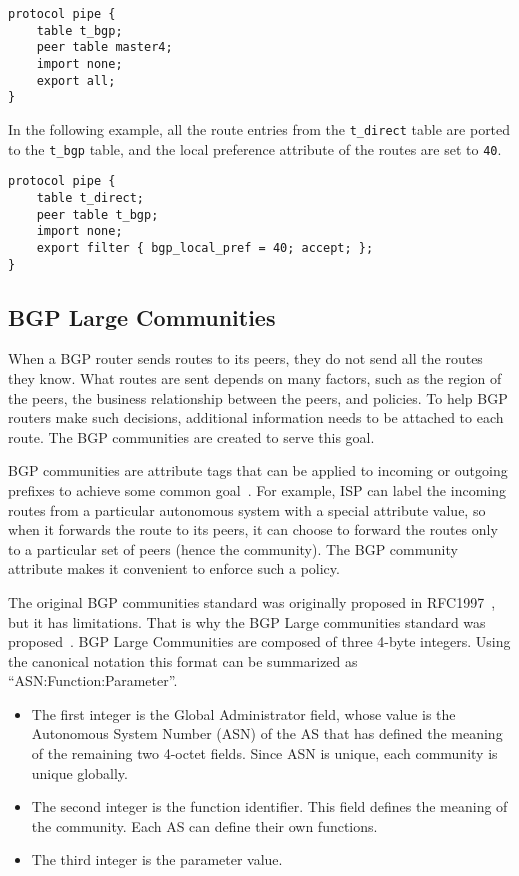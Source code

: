 \begin{lstlisting}
protocol pipe {
    table t_bgp;
    peer table master4;
    import none;
    export all;
}
\end{lstlisting}

In the following example, all the route entries from the \texttt{t\_direct}
table are ported to the \texttt{t\_bgp} table, and the local preference
attribute of the routes are set to \texttt{40}.

\begin{lstlisting}
protocol pipe {
    table t_direct;
    peer table t_bgp;
    import none;
    export filter { bgp_local_pref = 40; accept; };
}
\end{lstlisting}
 


\subsection{BGP Large Communities} 


When a BGP router sends routes to its peers, they do not send all the routes they
know. What routes are sent depends on many factors, such as the
region of the peers, the business relationship between the peers, 
and policies. To help BGP routers make such decisions, additional 
information needs to be attached to each route.
The BGP communities are created to serve this goal.


BGP communities are attribute tags that can be applied to incoming or outgoing prefixes to
achieve some common goal~\cite{rfc1997}. For example, ISP can label the incoming routes 
from a particular autonomous system with a special attribute value, 
so when it forwards the route to its peers, it can choose to forward
the routes only to a particular set of peers (hence the community). 
The BGP community attribute makes it convenient to enforce such a policy.

The original BGP communities standard was originally proposed in RFC1997~\cite{rfc1997},
but it has limitations. That is why the BGP Large communities 
standard was proposed~\cite{rfc8195}. 
BGP Large Communities are composed of three 4-byte integers.
Using the canonical notation this format can be summarized 
as ``ASN:Function:Parameter''.

\begin{itemize}
\item The first integer is the Global Administrator field, whose value is the
   Autonomous System Number (ASN) of the AS that has defined the meaning
   of the remaining two 4-octet fields. Since ASN is unique, 
   each community is unique globally.

\item The second integer is the function identifier. This field defines
  the meaning of the community. Each AS can define their own
  functions. 

\item The third integer is the parameter value. 
\end{itemize}
 
